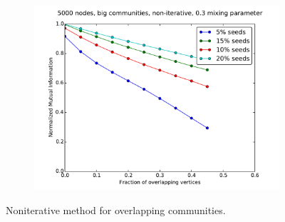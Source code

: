 \begin{figure}
\begin{subfigure}{0.5\textwidth}
    \includegraphics[width=\linewidth]{allplots/overlap_noniter_3mu_d.pdf}
    \end{subfigure}
    \caption{Noniterative method for overlapping communities.}
\end{figure}



